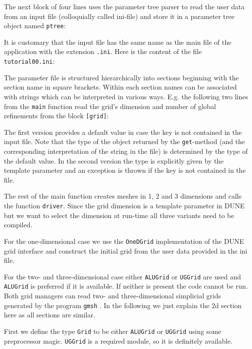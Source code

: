 \documentclass[a4paper,12pt]{article}
\begin{document}
The next block of four lines uses the parameter tree parser to
read the user data from an input file (colloquially called ini-file)
and store it in a parameter tree object
named \lstinline{ptree}:

It is customary that the input file has the same name as the 
main file of the application with the extension \lstinline{.ini}.
Here is the content of the file \lstinline{tutorial00.ini}:

The parameter file is structured hierarchically into 
sections beginning with the section name in square brackets.
Within each section names can be associated with strings which
can be interpreted in various ways. 
E.g. the following two lines from the \lstinline{main} function read the grid's
dimension and number of global refinements from the block \lstinline{[grid]}:

The first version provides a default value in case the key is not
contained in the input file. Note that the type of the object returned by the 
\lstinline{get}-method (and the corresponding interpretation of the string in the
file) is determined by the type of the default value. In the second version
the type is explicitly given by the template parameter and an exception
is thrown if the key is not contained in the file.

The rest of the main function creates meshes in 1, 2 and 3 dimensions
and calls the function \lstinline{driver}. Since the grid dimension is a template
parameter in DUNE but we want to select the dimension at run-time all three variants
need to be compiled. 

For the one-dimensional case we use the \lstinline{OneDGrid} implementation
of the DUNE grid interface and construct the initial grid from the user data
provided in the ini file.

For the two- and three-dimensional case either \lstinline{ALUGrid} or
\lstinline{UGGrid} are used and \lstinline{ALUGrid} is preferred if it is available. 
If neither is present the code cannot be run.
Both grid managers can read two- and three-dimensional simplicial
grids generated by the program \lstinline{gmsh} \cite{NME:NME2579}.
In the following we just explain the 2d section here as all sections are similar.

First we define the type \lstinline{Grid} to be either
\lstinline{ALUGrid} or \lstinline{UGGrid} using some
preprocessor magic. \lstinline{UGGrid} is a required module, so it is definitely available.

\end{document}
